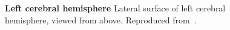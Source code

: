 \begin{figure}[htbp]
	\centering

	\caption[Left cerebral hemisphere]{\textbf{Left cerebral hemisphere}
	Lateral surface of left cerebral hemisphere, viewed from above.
	Reproduced from~\citet{gray:1918}.}	
	\label{fig:appendix:ba-lateral}
\end{figure}
